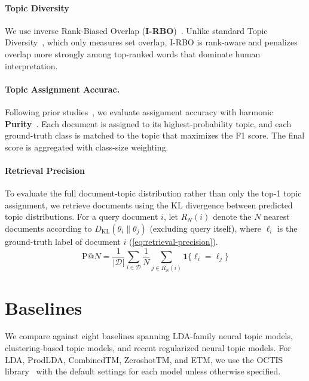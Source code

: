 \documentclass{article}
\theoremstyle{plain}
\theoremstyle{definition}
\theoremstyle{remark}
\begin{document}
\paragraph{Topic Diversity}
We use inverse Rank-Biased Overlap (\textbf{I-RBO})~\citep{terragni2021word, bianchi-etal-2021-pre}. Unlike standard Topic Diversity~\citep{dieng-etal-2020-topic}, which only measures set overlap, I-RBO is rank-aware and penalizes overlap more strongly among top-ranked words that dominate human interpretation.

\paragraph{Topic Assignment Accurac.}
Following prior studies~\citep{poursabzi-sangdeh-etal-2016-alto, hoyle-etal-2022-neural}, we evaluate assignment accuracy with harmonic \textbf{Purity}~\citep{zhao2001criterion}. Each document is assigned to its highest-probability topic, and each ground-truth class is matched to the topic that maximizes the F1 score. The final score is aggregated with class-size weighting.

\paragraph{Retrieval Precision}
To evaluate the full document-topic distribution rather than only the top-1 topic assignment, we retrieve documents using the KL divergence between predicted topic distributions. For a query document $i$, let $R_N(i)$ denote the $N$ nearest documents according to $D_{\mathrm{KL}}(\theta_i\|\theta_j)$ (excluding query itself), where $\ell_i$ is the ground-truth label of document $i$ (\autoref{eq:retrieval-precision}).
\begin{equation}
\mathrm{P@}N
=
\frac{1}{|\mathcal{D}|}
\sum_{i\in\mathcal{D}}
\frac{1}{N}
\sum_{j\in R_N(i)}
\mathbf{1}\{\ell_i=\ell_j\}
\label{eq:retrieval-precision}
\end{equation}


\section{Baselines}
\label{sec:baseline-detailed}

We compare against eight baselines spanning LDA-family neural topic models, clustering-based topic models, and recent regularized neural topic models. For LDA, ProdLDA, CombinedTM, ZeroshotTM, and ETM, we use the OCTIS library~\citep{terragni-etal-2021-octis} with the default settings for each model unless otherwise specified.
\end{document}
